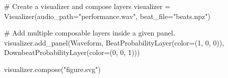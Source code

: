 # Create a visualizer and compose layers
visualizer = Visualizer(audio_path="performance.wav", 
                        beat_file="beats.npz")

# Add multiple composable layers inside a given panel.
visualizer.add_panel(Waveform,
                     BeatProbabilityLayer(color=(1, 0, 0)),
                     DownbeatProbabilityLayer(color=(0, 0, 1)))

visualizer.compose("figure.svg")